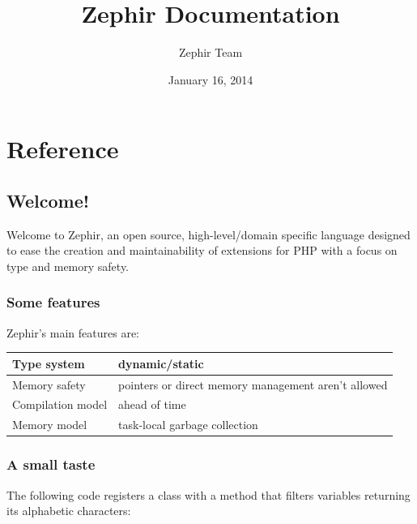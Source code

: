 \documentclass[letterpaper,10pt,english]{sphinxmanual}
\title{Zephir Documentation}
\date{January 16, 2014}
\author{Zephir Team}
\begin{document}
\maketitle
\tableofcontents
{}\label{index::doc}



\chapter{Reference}
\label{index:zephir-language}\label{index:reference}

\section{Welcome!}
\label{welcome:welcome}\label{welcome::doc}
Welcome to Zephir, an open source, high-level/domain specific language
designed to ease the creation and maintainability of extensions for PHP
with a focus on type and memory safety.


\subsection{Some features}
\label{welcome:some-features}
Zephir's main features are:

\begin{tabulary}{\linewidth}{|L|L|}
\hline

Type system
 & 
dynamic/static
\\\hline

Memory safety
 & 
pointers or direct memory management aren't allowed
\\\hline

Compilation model
 & 
ahead of time
\\\hline

Memory model
 & 
task-local garbage collection
\\\hline
\end{tabulary}



\subsection{A small taste}
\label{welcome:a-small-taste}
The following code registers a class with a method that filters variables returning its
alphabetic characters:
\end{document}
